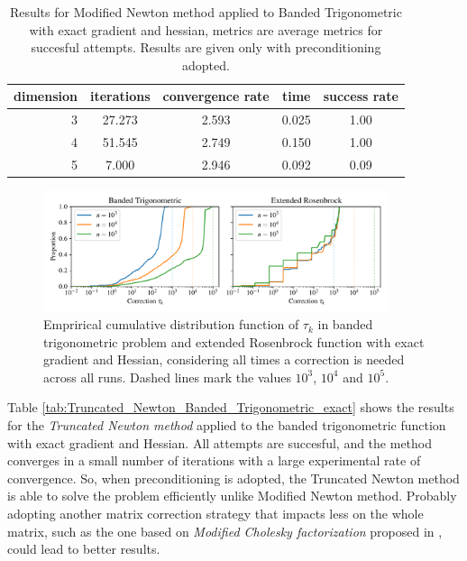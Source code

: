 \begin{table}
\centering
\caption{Results for Modified Newton method applied to Banded Trigonometric with exact gradient and hessian, metrics are average metrics for succesful attempts. Results are given only with preconditioning adopted.}
\label{tab:Modified_Newton_Banded_Trigonometric_exact}
\begin{tabular}{r|cccc}
\toprule
dimension & iterations & convergence rate & time & success rate \\
\midrule
3 & 27.273 & 2.593 & 0.025 & 1.00 \\
4 & 51.545 & 2.749 & 0.150 & 1.00 \\
5 & 7.000 & 2.946 & 0.092 & 0.09 \\
\bottomrule
\end{tabular}
\end{table}

\begin{figure}
    \centering
    \includegraphics[width=0.9\textwidth]{figures/correction_comparison.pdf}
    \caption{Emprirical cumulative distribution function of $\tau_k$ in banded trigonometric problem and extended Rosenbrock function with exact gradient and Hessian, considering all times a correction is needed across all runs. Dashed lines mark the values $10^3$, $10^4$ and $10^5$.}
    \label{fig:correction_comparison}
\end{figure}

Table \ref{tab:Truncated_Newton_Banded_Trigonometric_exact} shows the results for the \textit{Truncated Newton method} applied to the banded trigonometric function with exact gradient and Hessian.
All attempts are succesful, and the method converges in a small number of iterations with a large experimental rate of convergence.
So, when preconditioning is adopted, the Truncated Newton method is able to solve the problem efficiently unlike Modified Newton method.
Probably adopting another matrix correction strategy that impacts less on the whole matrix, such as the one based on \textit{Modified Cholesky factorization} proposed in \cite{nocedal-optimization}, could lead to better results.

